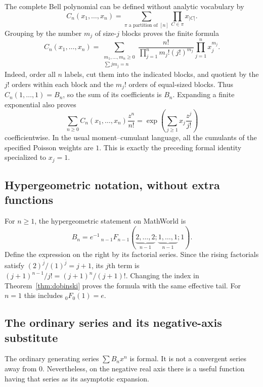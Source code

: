 The complete Bell polynomial can be defined without analytic vocabulary by
\[
 C_n(x_1,\ldots,x_n)
 =\sum_{\pi\text{ a partition of }[n]}
       \prod_{C\in\pi}x_{|C|}.
\]
Grouping by the number $m_j$ of size-$j$ blocks proves the finite formula
\begin{equation}\label{eq:block-multiplicity}
 C_n(x_1,\ldots,x_n)
 =\sum_{\substack{m_1,\ldots,m_n\ge0\\\sum j m_j=n}}
   \frac{n!}{\prod_{j=1}^n m_j!(j!)^{m_j}}
   \prod_{j=1}^n x_j^{m_j}.
\end{equation}
Indeed, order all $n$ labels, cut them into the indicated blocks, and quotient
by the $j!$ orders within each block and the $m_j!$ orders of equal-sized blocks.
Thus $C_n(1,\ldots,1)=B_n$, so the sum of its coefficients is $B_n$.
Expanding a finite exponential also proves
\[
 \sum_{n\ge0}C_n(x_1,\ldots,x_n)\frac{z^n}{n!}
 =\exp\left(\sum_{j\ge1}x_j\frac{z^j}{j!}\right)
\]
coefficientwise.  In the usual moment--cumulant language, all the cumulants of
the specified Poisson weights are $1$.  This is exactly the preceding formal
identity specialized to $x_j=1$.

\subsection{Hypergeometric notation, without extra functions}

For $n\ge1$, the hypergeometric statement on MathWorld is
\[
 B_n=e^{-1}\,{}_{n-1}F_{n-1}
     (\underbrace{2,\ldots,2}_{n-1};
      \underbrace{1,\ldots,1}_{n-1};1).
\]
Define the expression on the right by its factorial series.  Since the rising
factorials satisfy $(2)^{\overline j}/(1)^{\overline j}=j+1$, its $j$th term is
$(j+1)^{n-1}/j!=(j+1)^n/(j+1)!$.  Changing the index in
Theorem~\ref{thm:dobinski} proves the formula with the same effective tail.
For $n=1$ this includes ${}_0F_0(1)=e$.

\subsection{The ordinary series and its negative-axis substitute}

The ordinary generating series $\sum B_nx^n$ is formal.  It is not a
convergent series away from $0$.  Nevertheless, on the negative real axis
there is a useful function having that series as its asymptotic expansion.

